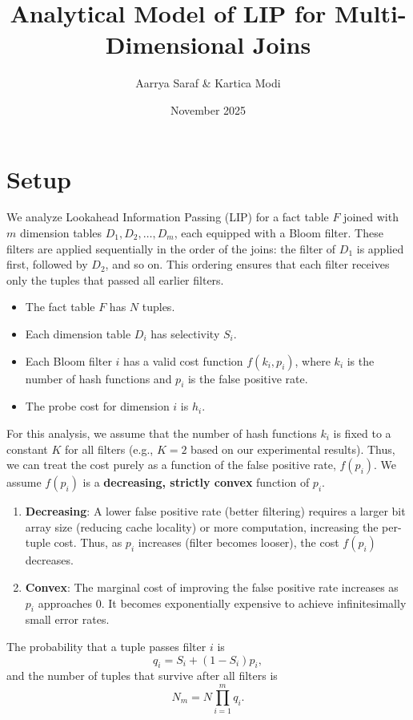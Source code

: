 \documentclass{article}
\title{Analytical Model of LIP for Multi-Dimensional Joins}
\author{Aarrya Saraf \& Kartica Modi}
\date{November 2025}
\begin{document}
\maketitle

\section{Setup}
We analyze Lookahead Information Passing (LIP) for a fact table $F$ joined with 
$m$ dimension tables $D_1, D_2, \dots, D_m$, each equipped with a Bloom filter.
These filters are applied sequentially in the order of the joins:
the filter of $D_1$ is applied first, followed by $D_2$, and so on.
This ordering ensures that each filter receives only the tuples that passed all earlier filters.

\begin{itemize}
    \item The fact table $F$ has $N$ tuples.
    \item Each dimension table $D_i$ has selectivity $S_i$.
    \item Each Bloom filter $i$ has a valid cost function $f(k_i, p_i)$, where $k_i$ is the number of hash functions and $p_i$ is the false positive rate.
    \item The probe cost for dimension $i$ is $h_i$.
\end{itemize}

For this analysis, we assume that the number of hash functions $k_i$ is fixed to a constant $K$ for all filters (e.g., $K=2$ based on our experimental results). Thus, we can treat the cost purely as a function of the false positive rate, $f(p_i)$.
We assume $f(p_i)$ is a \textbf{decreasing, strictly convex} function of $p_i$.
\begin{enumerate}
    \item \textbf{Decreasing}: A lower false positive rate (better filtering) requires a larger bit array size (reducing cache locality) or more computation, increasing the per-tuple cost. Thus, as $p_i$ increases (filter becomes looser), the cost $f(p_i)$ decreases.
    \item \textbf{Convex}: The marginal cost of improving the false positive rate increases as $p_i$ approaches 0. It becomes exponentially expensive to achieve infinitesimally small error rates.
\end{enumerate}

The probability that a tuple passes filter $i$ is
\[
q_i = S_i + (1 - S_i)p_i,
\]
and the number of tuples that survive after all filters is
\[
N_m = N \prod_{i=1}^{m} q_i.
\]
\end{document}
